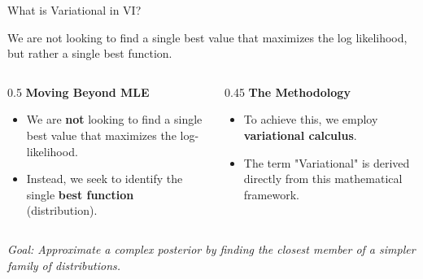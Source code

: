 \documentclass[aspectratio=169,xcolor=dvipsnames,svgnames,x11names,fleqn]{beamer}
\begin{document}
\begin{frame}{What is Variational in VI?}
    
    \begin{tcolorbox}[title=]
We are not looking to find a single best value that maximizes the log likelihood, but rather a single best function. 
    \end{tcolorbox}

    \vspace{0.5cm}

    \begin{columns}[T]
        \begin{column}{0.5\textwidth}
            \textbf{Moving Beyond MLE}
            \begin{itemize}
                \item We are \textbf{not} looking to find a single best value that maximizes the log-likelihood.
                \item Instead, we seek to identify the single \textbf{best function} (distribution).
            \end{itemize}
        \end{column}
        
        \vrule{}
        
        \begin{column}{0.45\textwidth}
            \textbf{The Methodology}
            \begin{itemize}
                \item To achieve this, we employ \textbf{variational calculus}.
                \item The term "Variational" is derived directly from this mathematical framework.
            \end{itemize}
        \end{column}
    \end{columns}

    \vspace{0.8cm}
    
    \begin{center}
        \footnotesize
        \textit{Goal: Approximate a complex posterior by finding the closest member of a simpler family of distributions.}
    \end{center}

\end{frame}
\end{document}
